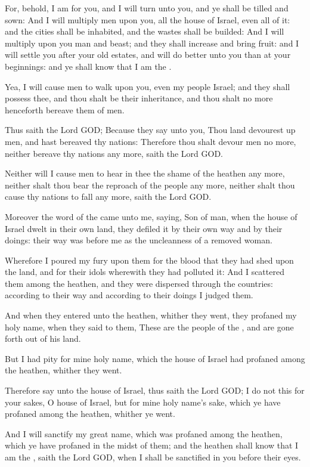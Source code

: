 \Verse For, behold, I am for you, and I will turn unto you, and ye shall be tilled and sown: \Verse And I will multiply men upon you, all the house of Israel, even all of it: and the cities shall be inhabited, and the wastes shall be builded: \Verse And I will multiply upon you man and beast; and they shall increase and bring fruit: and I will settle you after your old estates, and will do better unto you than at your beginnings: and ye shall know that I am the \LORD.

\Verse Yea, I will cause men to walk upon you, even my people Israel; and they shall possess thee, and thou shalt be their inheritance, and thou shalt no more henceforth bereave them of men.

\Verse Thus saith the Lord GOD; Because they say unto you, Thou land devourest up men, and hast bereaved thy nations: \Verse Therefore thou shalt devour men no more, neither bereave thy nations any more, saith the Lord GOD.

\Verse Neither will I cause men to hear in thee the shame of the heathen any more, neither shalt thou bear the reproach of the people any more, neither shalt thou cause thy nations to fall any more, saith the Lord GOD.

\Verse Moreover the word of the \LORD came unto me, saying, \Verse Son of man, when the house of Israel dwelt in their own land, they defiled it by their own way and by their doings: their way was before me as the uncleanness of a removed woman.

\Verse Wherefore I poured my fury upon them for the blood that they had shed upon the land, and for their idols wherewith they had polluted it: \Verse And I scattered them among the heathen, and they were dispersed through the countries: according to their way and according to their doings I judged them.

\Verse And when they entered unto the heathen, whither they went, they profaned my holy name, when they said to them, These are the people of the \LORD, and are gone forth out of his land.

\Verse But I had pity for mine holy name, which the house of Israel had profaned among the heathen, whither they went.

\Verse Therefore say unto the house of Israel, thus saith the Lord GOD; I do not this for your sakes, O house of Israel, but for mine holy name's sake, which ye have profaned among the heathen, whither ye went.

\Verse And I will sanctify my great name, which was profaned among the heathen, which ye have profaned in the midst of them; and the heathen shall know that I am the \LORD, saith the Lord GOD, when I shall be sanctified in you before their eyes.

